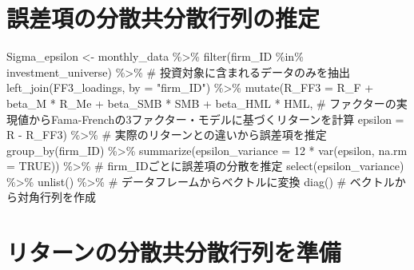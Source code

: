 \documentclass[
  letterpaper,
  DIV=11,
  numbers=noendperiod]{scrreprt}
\newenvironment{Shaded}{\begin{snugshade}}{\end{snugshade}}
\newcommand{\AttributeTok}[1]{\textcolor[rgb]{0.40,0.45,0.13}{#1}}
\newcommand{\CommentTok}[1]{\textcolor[rgb]{0.37,0.37,0.37}{#1}}
\newcommand{\ConstantTok}[1]{\textcolor[rgb]{0.56,0.35,0.01}{#1}}
\newcommand{\DecValTok}[1]{\textcolor[rgb]{0.68,0.00,0.00}{#1}}
\newcommand{\FunctionTok}[1]{\textcolor[rgb]{0.28,0.35,0.67}{#1}}
\newcommand{\NormalTok}[1]{\textcolor[rgb]{0.00,0.23,0.31}{#1}}
\newcommand{\OtherTok}[1]{\textcolor[rgb]{0.00,0.23,0.31}{#1}}
\newcommand{\SpecialCharTok}[1]{\textcolor[rgb]{0.37,0.37,0.37}{#1}}
\newcommand{\StringTok}[1]{\textcolor[rgb]{0.13,0.47,0.30}{#1}}
\begin{document}
\section{誤差項の分散共分散行列の推定}\label{ux8aa4ux5deeux9805ux306eux5206ux6563ux5171ux5206ux6563ux884cux5217ux306eux63a8ux5b9a}

\begin{Shaded}
\begin{Highlighting}[]
\NormalTok{Sigma\_epsilon }\OtherTok{\textless{}{-}}\NormalTok{ monthly\_data }\SpecialCharTok{\%\textgreater{}\%}
  \FunctionTok{filter}\NormalTok{(firm\_ID }\SpecialCharTok{\%in\%}\NormalTok{ investment\_universe) }\SpecialCharTok{\%\textgreater{}\%} \CommentTok{\# 投資対象に含まれるデータのみを抽出}
  \FunctionTok{left\_join}\NormalTok{(FF3\_loadings, }\AttributeTok{by =} \StringTok{"firm\_ID"}\NormalTok{) }\SpecialCharTok{\%\textgreater{}\%}
  \FunctionTok{mutate}\NormalTok{(}\AttributeTok{R\_FF3 =}\NormalTok{ R\_F }\SpecialCharTok{+}\NormalTok{ beta\_M }\SpecialCharTok{*}\NormalTok{ R\_Me }\SpecialCharTok{+}\NormalTok{ beta\_SMB }\SpecialCharTok{*}\NormalTok{ SMB }\SpecialCharTok{+}\NormalTok{ beta\_HML }\SpecialCharTok{*}\NormalTok{ HML, }\CommentTok{\# ファクターの実現値からFama{-}Frenchの3ファクター・モデルに基づくリターンを計算}
         \AttributeTok{epsilon =}\NormalTok{ R }\SpecialCharTok{{-}}\NormalTok{ R\_FF3) }\SpecialCharTok{\%\textgreater{}\%} \CommentTok{\# 実際のリターンとの違いから誤差項を推定}
  \FunctionTok{group\_by}\NormalTok{(firm\_ID) }\SpecialCharTok{\%\textgreater{}\%} 
  \FunctionTok{summarize}\NormalTok{(}\AttributeTok{epsilon\_variance =} \DecValTok{12} \SpecialCharTok{*} \FunctionTok{var}\NormalTok{(epsilon, }\AttributeTok{na.rm =} \ConstantTok{TRUE}\NormalTok{)) }\SpecialCharTok{\%\textgreater{}\%} \CommentTok{\# firm\_IDごとに誤差項の分散を推定}
  \FunctionTok{select}\NormalTok{(epsilon\_variance) }\SpecialCharTok{\%\textgreater{}\%} 
  \FunctionTok{unlist}\NormalTok{() }\SpecialCharTok{\%\textgreater{}\%} \CommentTok{\# データフレームからベクトルに変換}
  \FunctionTok{diag}\NormalTok{() }\CommentTok{\# ベクトルから対角行列を作成}
\end{Highlighting}
\end{Shaded}

\section{リターンの分散共分散行列を準備}\label{ux30eaux30bfux30fcux30f3ux306eux5206ux6563ux5171ux5206ux6563ux884cux5217ux3092ux6e96ux5099}
\end{document}
